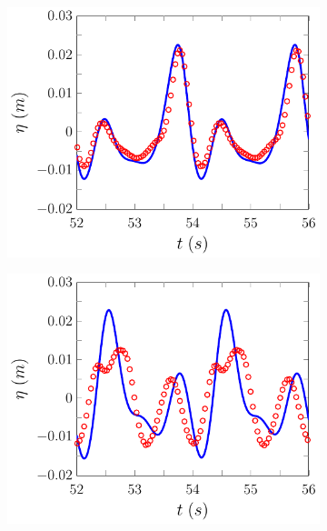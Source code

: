 \begin{figure}
	\centering
	\begin{subfigure}{0.5\textwidth}
		\includegraphics[width=\textwidth]{./chp6/figures/Experiment/Beji/sl/FDVMWG5.pdf}
		\vspace{0.5cm}
	\end{subfigure}%
	\begin{subfigure}{0.5\textwidth}
		\includegraphics[width=\textwidth]{./chp6/figures/Experiment/Beji/sl/FDVMWG6.pdf}
		\vspace{0.5cm}
	\end{subfigure}

\end{figure}
